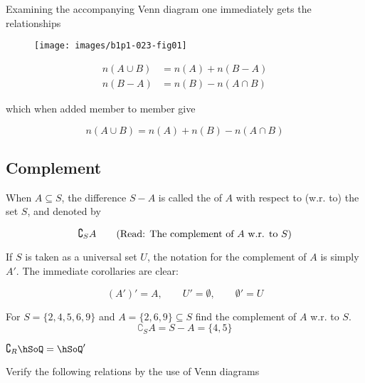 \documentclass[11pt]{amsbook}
\begin{document}




Examining the accompanying Venn diagram one immediately gets the relationships 

\begin{figure}[htbp]
	\begin{center}
		\texttt{[image: images/b1p1-023-fig01]}
	\end{center}
\end{figure}

\begin{align*}
	n(A \cup B) &= n(A) + n(B-A)\\
	n(B-A) &= n(B) - n(A \cap B)
\end{align*}

\noindent which when added member to member give

\begin{equation*}
	n(A \cup B) = n(A) + n(B) - n(A \cap B)
\end{equation*}

\subsection{Complement}
	When $A \subseteq S$, the difference $S - A$ is called the  of $A$ with 
	respect to (w.r. to) the set $S$, and denoted by

\begin{equation*}
	\complement_{S} A \textrm{\quad\quad (Read: The complement of $A$ w.r. to $S$)}
\end{equation*}

If $S$ is taken as a universal set $U$, the notation for the complement of
$A$ is simply $A'$. The immediate corollaries are clear:

\begin{equation*}
	(A')' = A, \quad\quad U' = \emptyset, \quad\quad \emptyset' = U
\end{equation*}

\begin{exmp}
	For $S = \{2, 4, 5, 6, 9\}$ and $A = \{2, 6, 9\} \subseteq S$ find the complement of $A$ w.r. to $S$.\\
	\begin{equation*}
		\complement_{S} A = S - A = \{4, 5\}
	\end{equation*}
\end{exmp}

\begin{exmp}
	$\complement_{R} \hSoQ = \hSoQ'$
\end{exmp}

\begin{exmp}
	Verify the following relations by the use of Venn diagrams
\end{exmp}

\end{document}
